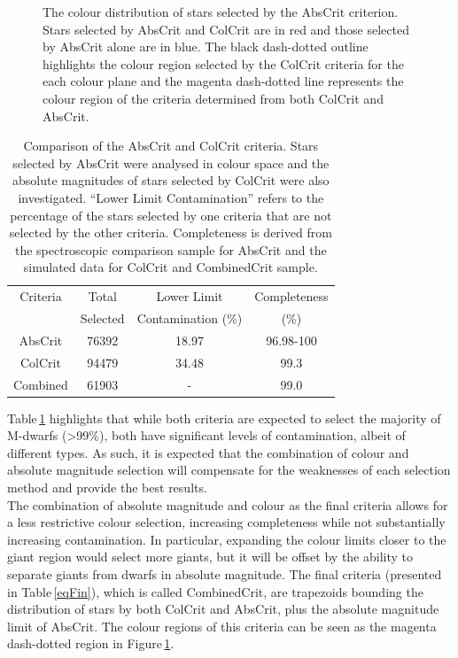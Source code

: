 \begin{figure}
\caption{The colour distribution of stars selected by the AbsCrit criterion. Stars selected by AbsCrit and ColCrit are in red and those selected by AbsCrit alone are in blue. The black dash-dotted outline highlights the colour region selected by the ColCrit criteria for the each colour plane and the magenta dash-dotted line represents the colour region of the criteria determined from both ColCrit and AbsCrit.}
\label{figAbsNew}
\end{figure}

\begin{table}
    \centering
	\begin{tabular}{ | c | c c c | }
		\hline
		Criteria & Total & Lower Limit & Completeness\\
		         & Selected & Contamination (\%) & (\%)\\
		\hline
		AbsCrit & 76392 & 18.97 & 96.98-100\\
		ColCrit & 94479 & 34.48 & 99.3\\
        Combined & 61903 & - & 99.0\\
		\hline
	\end{tabular}
    \caption{Comparison of the AbsCrit and ColCrit criteria. Stars selected by AbsCrit were analysed in colour space and the absolute magnitudes of stars selected by ColCrit were also investigated. ``Lower Limit Contamination'' refers to the percentage of the stars selected by one criteria that are not selected by the other criteria. Completeness is derived from the spectroscopic comparison sample for AbsCrit and the simulated data for ColCrit and CombinedCrit sample.}
    \label{tabAbsNew}
\end{table}
Table\,\ref{tabAbsNew} highlights that while both criteria are expected to select the majority of M-dwarfs (\textgreater99\%), both have significant levels of contamination, albeit of different types. As such, it is expected that the combination of colour and absolute magnitude selection will compensate for the weaknesses of each selection method and provide the best results.\\

The combination of absolute magnitude and colour as the final criteria allows for a less restrictive colour selection, increasing completeness while not substantially increasing contamination. In particular, expanding the colour limits closer to the giant region would select more giants, but it will be offset by the ability to separate giants from dwarfs in absolute magnitude. The final criteria (presented in Table\,\ref{eqFin}), which is called CombinedCrit, are trapezoids bounding the distribution of stars by both ColCrit and AbsCrit, plus the absolute magnitude limit of AbsCrit. The colour regions of this criteria can be seen as the magenta dash-dotted region in Figure\,\ref{figAbsNew}.\\ 

